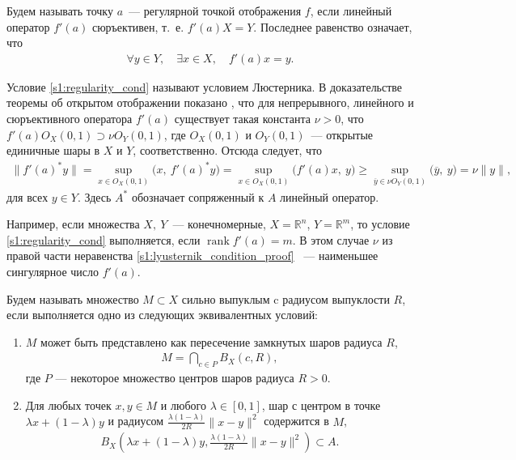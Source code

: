 \documentclass[../main.tex]{subfiles}
\begin{document}
Будем называть точку $a$~--- регулярной точкой отображения $f$, если линейный оператор $f'(a)$ сюръективен, т.~е. $ f'(a) X = Y $.
Последнее равенство означает, что 
\begin{gather}\label{s1:regularity_cond}
 \forall y \in Y, \quad \exists x \in X, \quad f'(a) x = y.
\end{gather}

Условие \eqref{s1:regularity_cond} называют условием Люстерника\cite{Dmitruk1980}.
В доказательстве теоремы об открытом отображении показано \cite[Теорема 2.11, Теорема 4.13]{Rudin}, что для непрерывного, линейного и сюръективного оператора $f'(a)$ существует такая константа $\nu > 0$, что $f'(a) O_X(0, 1) \supset \nu O_Y(0, 1)$, где $ O_X(0, 1)$ и $O_Y(0, 1)$~--- открытые единичные шары в $X$ и $Y$, соответственно.
Отсюда следует, что
\begin{gather}\label{s1:lyusternik_condition_proof}
 \| f'(a)^* y \| = \sup\limits_{x \in O_X(0, 1)} \big(x,\ f'(a)^* y\big) = \sup\limits_{x \in O_X(0, 1)} \big(f'(a) x,\ y\big) \geqslant \sup\limits_{\overline{y} \in \nu O_Y(0, 1)} \big(\overline{y},\ y\big) = \nu \|y\|,
\end{gather}
для всех $y \in Y$.
Здесь $A^*$ обозначает сопряженный к $A$ линейный оператор.
 
Например, если множества $X,\ Y$~--- конечномерные, $X = \mathbb{R}^n$, $Y = \mathbb{R}^m$, то условие \eqref{s1:regularity_cond} выполняется, если $ \operatorname{rank} f'(a) = m$.
В этом случае $\nu$ из правой части неравенства \eqref{s1:lyusternik_condition_proof} ~--- наименьшее сингулярное число $f'(a)$. 

\begin{definition}
		Будем называть множество $M \subset X $ сильно выпуклым c радиусом выпуклости $R$, если выполняется одно из следующих эквивалентных условий:
		\begin{enumerate}
			\item $M$ может быть представлено как пересечение замкнутых шаров радиуса $R$,
			\begin{gather*}
				M = \bigcap\limits_{c \in P} B_X (c, R),
			\end{gather*}
			где $P$ --- некоторое множество центров шаров радиуса $R > 0$.
			\item Для любых точек $x, y \in M$ и любого $\lambda \in [0, 1]$, шар с центром в точке $\lambda x + (1 - \lambda) y $ и радиусом $\frac{\lambda (1 - \lambda)} {2 R} \| x - y \|^2$ содержится в $M$,
			\begin{gather*}
				B_X\left(\lambda x + (1 - \lambda) y, \frac{\lambda (1 - \lambda)} {2 R} \| x - y \|^2\right) \subset A.
			\end{gather*}
		\end{enumerate}
\end{definition}
\end{document}
